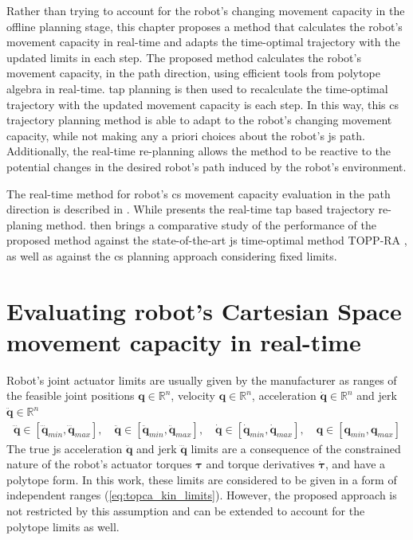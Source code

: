 Rather than trying to account for the robot's changing movement capacity in the offline planning stage, this chapter proposes a method that calculates the robot's movement capacity in real-time and adapts the time-optimal trajectory with the updated limits in each step. 
The proposed method calculates the robot's movement capacity, in the path direction, using efficient tools from polytope algebra in real-time. \gls{tap} planning is then used to recalculate the time-optimal trajectory with the updated movement capacity is each step.
In this way, this \gls{cs} trajectory planning method is able to adapt to the robot's changing movement capacity, while not making any a priori choices about the robot's \gls{js} path. Additionally, the real-time re-planning allows the method to be reactive to the potential changes in the desired robot's path induced by the robot's environment.

The real-time method for robot's \gls{cs} movement capacity evaluation in the path direction is described in . While  presents the real-time \gls{tap} based trajectory re-planing method. 
 then brings a comparative study of the performance of the proposed method against the state-of-the-art \gls{js} time-optimal method TOPP-RA \cite{Pham2018}, as well as against the \gls{cs} planning approach considering fixed limits.


\section{Evaluating robot's Cartesian Space movement capacity in real-time}
\label{ch:capacity}

Robot's joint actuator limits are usually given by the manufacturer as ranges of the feasible joint positions $\bm{q}\in\mathbb{R}^n$, velocity $\bm{q}\in\mathbb{R}^n$, acceleration $\dot{\bm{q}}\in\mathbb{R}^n$ and jerk $\ddot{\bm{q}}\in\mathbb{R}^n$
\begin{equation}
\begin{split}
\dddot{\bm{q}} \in [ \dddot{\bm{q}}_{min}, \dddot{\bm{q}}_{max}] , \quad\ddot{\bm{q}} \in [\ddot{\bm{q}}_{min},  \ddot{\bm{q}}_{max}],\quad
\dot{\bm{q}} \in [\dot{\bm{q}}_{min},  \dot{\bm{q}}_{max}], \quad{\bm{q}} \in [{\bm{q}}_{min},  {\bm{q}}_{max}]
\end{split}
\label{eq:topca_kin_limits}
\end{equation}
The true \gls{js} acceleration $\ddot{\bm{q}}$ and jerk $\dddot{\bm{q}}$ limits are a consequence of the constrained nature of the robot's actuator torques $\bm{\tau}$ and torque derivatives $\dot{\bm{\tau}}$, and have a polytope form. In this work, these limits are considered to be given in a form of independent ranges (\ref{eq:topca_kin_limits}). However, the proposed approach is not restricted by this assumption and can be extended to account for the polytope limits as well.

